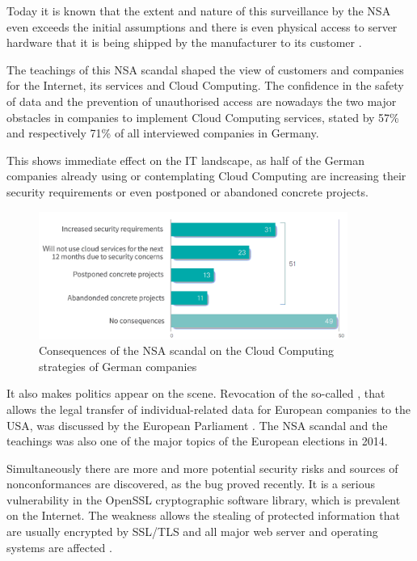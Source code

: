 Today it is known that the extent and nature of this surveillance by the NSA even exceeds the initial assumptions and there is even physical access to server hardware that it is being shipped by the manufacturer to its customer \cite{website:nsa-cisco}.

The teachings of this NSA scandal shaped the view of customers and companies for the Internet, its services and Cloud Computing. The confidence in the safety of data and the prevention of unauthorised access are nowadays the two major obstacles in companies to implement Cloud Computing services, stated by 57\% and respectively 71\% of all interviewed companies in Germany.

This shows immediate effect on the IT landscape, as half of the German companies already using or contemplating Cloud Computing are increasing their security requirements or even postponed or abandoned concrete projects.

\begin{figure}[H] %
	\centering
		\includegraphics[width=0.9\textwidth]{images/cloud_nsa_consequences_germany.png}
	\caption{Consequences of the NSA scandal on the Cloud Computing strategies of German companies \cite{kpmg2014cloud}}
\end{figure}

It also makes politics appear on the scene. Revocation of the so-called , that allows the legal transfer of individual-related data for European companies to the USA, was discussed by the European Parliament \cite{website:eupa-safe-harbour}. The NSA scandal and the teachings was also one of the major topics of the European elections in 2014. 

Simultaneously there are more and more potential security risks and sources of nonconformances are discovered, as the  bug proved recently. It is a serious vulnerability in the OpenSSL cryptographic software library, which is prevalent on the Internet. The weakness allows the stealing of protected information that are usually encrypted by SSL/TLS and all major web server and operating systems are affected \cite{website:heartbleed}.

